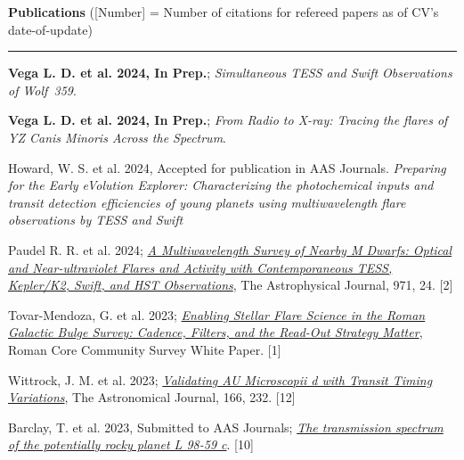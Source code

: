 \documentclass[letter,12pt]{article}
\begin{document}
\noindent
{\bf Publications} ([Number] = Number of citations for refereed papers as of CV's date-of-update) \\
\vspace{-10mm}
\begin{center}
\rule{\textwidth}{0.2mm}
\end{center}
\vspace{-3mm}
\noindent
\begin{etaremune}
\renewcommand\labelenumi{\bfseries\theenumi .}
\item {\bf Vega L. D. et al. 2024, In Prep.}; {\it Simultaneous TESS and Swift Observations of Wolf~359}.

\item {\bf Vega L. D. et al. 2024, In Prep.}; {\it From Radio to X-ray: Tracing the flares of YZ Canis Minoris Across the Spectrum}.

\item {Howard, W. S. et al. 2024, Accepted for publication in AAS Journals.} 
{\it Preparing for the Early eVolution Explorer: Characterizing the photochemical inputs and transit detection efficiencies of young planets using multiwavelength flare observations by TESS and Swift}

\item {Paudel R. R. et al. 2024}; 
\href{https://ui.adsabs.harvard.edu/abs/2024ApJ...971...24P/abstract}{\it A Multiwavelength Survey of Nearby M Dwarfs: Optical and Near-ultraviolet Flares and Activity with Contemporaneous TESS, Kepler/K2, {\it Swift}, and HST Observations}, The Astrophysical Journal, 971, 24. [2]

\item {Tovar-Mendoza, G. et al. 2023};
\href{https://ui.adsabs.harvard.edu/abs/2023arXiv230705806T/abstract}{\it Enabling Stellar Flare Science in the Roman Galactic Bulge Survey: Cadence, Filters, and the Read-Out Strategy Matter}, Roman Core Community Survey White Paper. [1]

\item {Wittrock, J. M. et al. 2023};
\href{https://ui.adsabs.harvard.edu/abs/2023arXiv230204922W/abstract}{\it Validating AU Microscopii d with Transit Timing Variations}, The Astronomical Journal, 166, 232. [12]

\item {Barclay, T. et al. 2023, Submitted to AAS Journals}; \href{https://ui.adsabs.harvard.edu/abs/2023arXiv230110866B/abstract}{\it The transmission spectrum of the potentially rocky planet L 98-59 c}. [10]


\end{etaremune}
\end{document}
